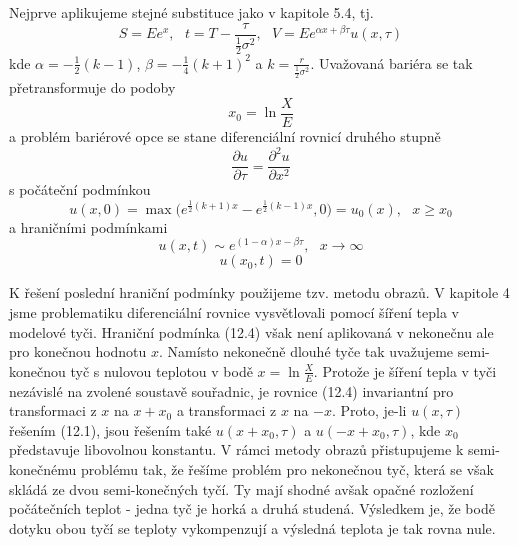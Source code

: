 \documentclass[a4paper]{book}
\begin{document}
Nejprve aplikujeme stejné substituce jako v kapitole 5.4, tj.
\begin{equation*}
S = Ee^x,~~~ t = T - \frac{\tau}{\frac{1}{2}\sigma^2}, ~~~ V = Ee^{\alpha x + \beta \tau}u(x, \tau)
\end{equation*}
kde $\alpha = -\frac{1}{2}(k-1)$, $\beta = -\frac{1}{4}(k+1)^2$ a $k = \frac{r}{\frac{1}{2}\sigma^2}$. Uvažovaná bariéra se tak přetransformuje do podoby
\begin{equation*}
x_0 = \ln \frac{X}{E}
\end{equation*}
a problém bariérové opce se stane diferenciální rovnicí druhého stupně
\begin{equation}
\frac{\partial u}{\partial \tau} = \frac{\partial^2 u}{\partial x^2}
\end{equation}
s počáteční podmínkou
\begin{equation}
u(x,0) = \max \Big( e^{\frac{1}{2}(k+1)x} - e^{\frac{1}{2}(k-1)x}, 0 \Big) = u_0(x), ~~~ x \ge x_0
\end{equation}
a hraničními podmínkami
\begin{equation}
u(x,t) \sim e^{(1 - \alpha)x - \beta \tau}, ~~~ x \rightarrow \infty
\end{equation}
\begin{equation}
u(x_0, t) = 0
\end{equation}

K řešení poslední hraniční podmínky použijeme tzv. metodu obrazů. V kapitole 4 jsme problematiku diferenciální rovnice vysvětlovali pomocí šíření tepla v modelové tyči. Hraniční podmínka (12.4) však není aplikovaná v nekonečnu ale pro konečnou hodnotu $x$. Namísto nekonečně dlouhé tyče tak uvažujeme semi-konečnou tyč s nulovou teplotou v bodě $x = \ln \frac{X}{E}$. Protože je šíření tepla v tyči nezávislé na zvolené soustavě souřadnic, je rovnice (12.4) invariantní pro transformaci z $x$ na $x + x_0$ a transformaci z $x$ na $-x$. Proto, je-li $u(x, \tau)$ řešením (12.1), jsou řešením také $u(x + x_0, \tau)$ a $u(-x + x_0, \tau)$, kde $x_0$ představuje libovolnou konstantu. V rámci metody obrazů přistupujeme k semi-konečnému problému tak, že řešíme problém pro nekonečnou tyč, která se však skládá ze dvou semi-konečných tyčí. Ty mají shodné avšak opačné rozložení počátečních teplot - jedna tyč je horká a druhá studená. Výsledkem je, že bodě dotyku obou tyčí se teploty vykompenzují a výsledná teplota je tak rovna nule.
\end{document}
